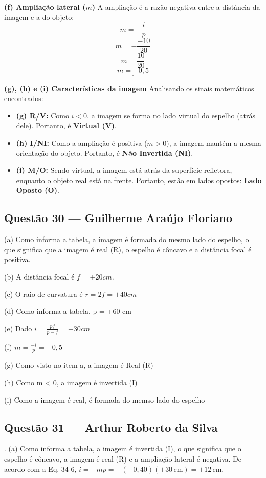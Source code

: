 \documentclass[12pt,a4paper]{article}
\begin{document}
\vspace{0.2cm}
\textbf{(f) Ampliação lateral (\(m\))}
A ampliação é a razão negativa entre a distância da imagem e a do objeto:
\[m = -\frac{i}{p}\]
\[m = -\frac{-10}{20}\]
\[m = \frac{10}{20}\]
\[\underline{m = +0,5}\]

\vspace{0.2cm}
\textbf{(g), (h) e (i) Características da imagem}
Analisando os sinais matemáticos encontrados:
\begin{itemize}
    \item \textbf{(g) R/V:} Como \(i < 0\), a imagem se forma no lado virtual do espelho (atrás dele). Portanto, é \textbf{Virtual (V)}.
    \item \textbf{(h) I/NI:} Como a ampliação é positiva (\(m > 0\)), a imagem mantém a mesma orientação do objeto. Portanto, é \textbf{Não Invertida (NI)}.
    \item \textbf{(i) M/O:} Sendo virtual, a imagem está atrás da superfície refletora, enquanto o objeto real está na frente. Portanto, estão em lados opostos: \textbf{Lado Oposto (O)}.
\end{itemize}

\subsection{Questão 30 — Guilherme Araújo Floriano}

(a) Como informa a tabela, a imagem é formada do mesmo lado do espelho, o que significa
que a imagem é real (R), o espelho é côncavo e a distância focal é positiva.

(b) A distância focal é $f = +20 cm$.

(c) O raio de curvatura é $r = 2f = +40 cm$

(d) Como informa a tabela, p = +60 cm

(e) Dado $i = \frac{pf}{p-f} = +30 cm$

(f) $m = \frac{-i}{p} = -0,5$

(g) Como visto no item a, a imagem é Real (R)

(h) Como m < 0, a imagem é invertida (I)

(i) Como a imagem é real, é formada do memso lado do espelho

\subsection{Questão 31 — Arthur Roberto da Silva}
. (a) Como informa a tabela, a imagem é invertida (I), o que significa que o espelho é cônca\-vo, a imagem é real (R) e a ampliação lateral é negativa. De acordo com a Eq. 34-6, $i = -mp = -(-0,40)(+30 \, \text{cm}) = +12 \, \text{cm}$.
\end{document}

